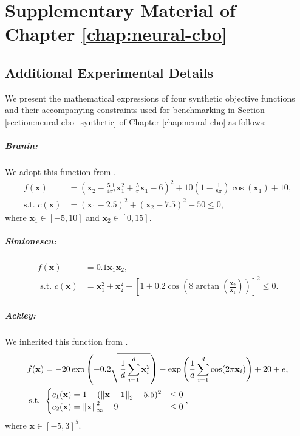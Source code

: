 \chapter{Supplementary Material of Chapter \ref{chap:neural-cbo}} 
\label{section:neural-cbo_supp}
\section{Additional Experimental Details}
\label{section:neural-cbo_experiments_synthetic}
We present the mathematical expressions of four synthetic objective functions and their accompanying constraints used for benchmarking in Section \ref{section:neural-cbo_synthetic} of Chapter \ref{chap:neural-cbo} as follows:
\paragraph{Branin:} We adopt this function from \citet{letham2019constrained}.
\begin{align*}
f(\mathbf{x}) &= \left( \mathbf{x}_2 - \frac{5.1}{4 \pi^2} \mathbf{x}_1^2 + \frac{5}{\pi} \mathbf{x}_1 - 6 \right)^2 + 10 \left( 1 - \frac{1}{8\pi} \right) \cos(\mathbf{x}_1) + 10,
\\
\text{s.t. } c(\mathbf{x}) &= (\mathbf{x}_1 - 2.5)^2 + (\mathbf{x}_2 - 7.5)^2 - 50 \le 0, 
\end{align*}
where \( \mathbf{x}_1 \in [-5, 10] \) and \( \mathbf{x}_2 \in [0, 15] \).
\paragraph{Simionescu:} 
\begin{align*}
    f(\mathbf{x}) &= 0.1\mathbf{x}_1 \mathbf{x}_2, 
    \\
    \text{ s.t. }   c(\mathbf{x}) &= \mathbf{x}_1^2 + \mathbf{x}_2^2 - \left[ 1 + 0.2 \cos(8 \arctan\left( \frac{\mathbf{x}_2}{\mathbf{x}_1} \right)) \right]^2 \le 0.
\end{align*}

\paragraph{Ackley:}  We inherited this function from \citet{zhang2023constrained}.
\begin{align*}
    f(\mathbf{x}) &= -20 \exp\left( -0.2 \sqrt{\frac{1}{d} \sum_{i=1}^{d} \mathbf{x}_i^2} \right)
- \exp\left( \frac{1}{d} \sum_{i=1}^{d} \cos(2 \pi \mathbf{x}_i) \right) + 20 + e,
    \\
    \text{s.t. } &  \begin{cases} 
    c_1 (\mathbf{x}) = 1 - (\norm{\mathbf{x}-\mathbf{1}}_2 - 5.5)^2  & \le 0 
    \\
    c_2 (\mathbf{x}) = \norm{\mathbf{x}}_\infty^2 - 9 & \le 0
    \end{cases},
\end{align*} where $\mathbf{x} \in [-5,3]^5$. 
